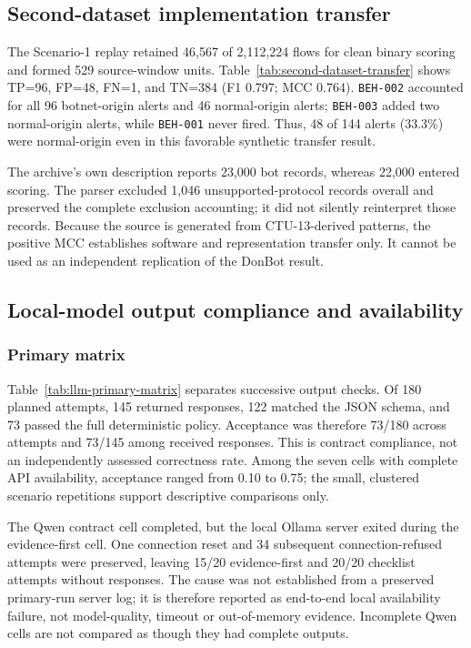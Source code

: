 \documentclass[11pt,a4paper,onecolumn]{IEEEtran}
\begin{document}
\subsection{Second-dataset implementation transfer}

The Scenario-1 replay retained 46,567 of 2,112,224 flows for clean binary scoring and formed 529 source-window units. Table~\ref{tab:second-dataset-transfer} shows TP=96, FP=48, FN=1, and TN=384 (F1 0.797; MCC 0.764). \texttt{BEH-002} accounted for all 96 botnet-origin alerts and 46 normal-origin alerts; \texttt{BEH-003} added two normal-origin alerts, while \texttt{BEH-001} never fired. Thus, 48 of 144 alerts (33.3\%) were normal-origin even in this favorable synthetic transfer result.



The archive's own description reports 23,000 bot records, whereas 22,000 entered scoring. The parser excluded 1,046 unsupported-protocol records overall and preserved the complete exclusion accounting; it did not silently reinterpret those records. Because the source is generated from CTU-13-derived patterns, the positive MCC establishes software and representation transfer only. It cannot be used as an independent replication of the DonBot result.

\subsection{Local-model output compliance and availability}

\subsubsection{Primary matrix}

Table~\ref{tab:llm-primary-matrix} separates successive output checks. Of 180 planned attempts, 145 returned responses, 122 matched the JSON schema, and 73 passed the full deterministic policy. Acceptance was therefore 73/180 across attempts and 73/145 among received responses. This is contract compliance, not an independently assessed correctness rate. Among the seven cells with complete API availability, acceptance ranged from 0.10 to 0.75; the small, clustered scenario repetitions support descriptive comparisons only.



The Qwen contract cell completed, but the local Ollama server exited during the evidence-first cell. One connection reset and 34 subsequent connection-refused attempts were preserved, leaving 15/20 evidence-first and 20/20 checklist attempts without responses. The cause was not established from a preserved primary-run server log; it is therefore reported as end-to-end local availability failure, not model-quality, timeout or out-of-memory evidence. Incomplete Qwen cells are not compared as though they had complete outputs.
\end{document}
